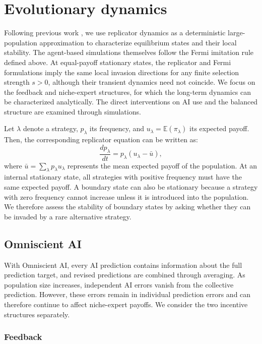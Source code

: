 \documentclass[12pt]{article}
\begin{document}
\section{Evolutionary dynamics}

Following previous work \citep{wang2025individual,taylor1978evolutionary,traulsen2005coevolutionary}, we use replicator dynamics as a deterministic large-population approximation to characterize equilibrium states and their local stability.
The agent-based simulations themselves follow the Fermi imitation rule defined above.
At equal-payoff stationary states, the replicator and Fermi formulations imply the same local invasion directions for any finite selection strength $s>0$, although their transient dynamics need not coincide.
We focus on the feedback and niche-expert structures, for which the long-term dynamics can be characterized analytically. 
The direct interventions on AI use and the balanced structure are examined through simulations.

Let $\lambda$ denote a strategy, $p_\lambda$ its frequency, and $u_\lambda=\mathbb{E}(\pi_\lambda)$ its expected payoff.
Then, the corresponding replicator equation can be written as:
\begin{equation}
\frac{dp_\lambda}{dt} = p_\lambda(u_\lambda-\bar{u}),
\end{equation}
where $\bar{u}=\sum_\lambda p_\lambda u_\lambda$ represents the mean expected payoff of the population. 
At an internal stationary state, all strategies with positive frequency must have the same expected payoff. 
A boundary state can also be stationary because a strategy with zero frequency cannot increase unless it is introduced into the population. 
We therefore assess the stability of boundary states by asking whether they can be invaded by a rare alternative strategy.

\subsection{Omniscient AI}

With Omniscient AI, every AI prediction contains information about the full prediction target, and revised predictions are combined through averaging. 
As population size increases, independent AI errors vanish from the collective prediction. 
However, these errors remain in individual prediction errors and can therefore continue to affect niche-expert payoffs. 
We consider the two incentive structures separately.

\subsubsection{Feedback}
\end{document}
